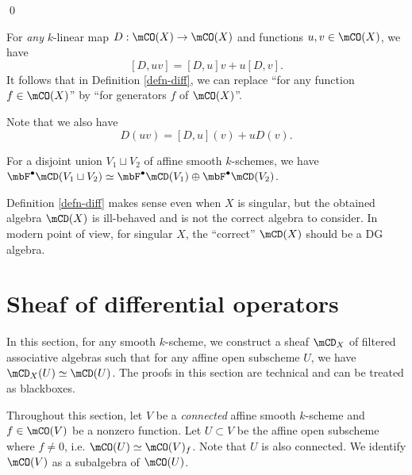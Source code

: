 	\qed

	\begin{rem}
		\label{rem-check-diff}
		For \emph{any} $k$-linear map $D: \mCO(X) \to \mCO(X)$ and functions $u,v\in \mCO(X)$, we have
		\begin{equation}
			\label{eqn-lebniz-for-commutator}
			[D, uv] = [D,u]v + u[D,v].
		\end{equation}
		It follows that in Definition \ref{defn-diff}, we can replace ``for any function $f\in \mCO(X)$'' by ``for generators $f$ of $\mCO(X)$''.

		Note that we also have
		\begin{equation}
			\label{eqn-lebniz-for-operator}
			D(uv) = [D,u](v) + uD(v).
		\end{equation}

	\end{rem}

	\begin{rem}
		\label{rem-diff-disj}
		For a disjoint union $V_1\sqcup V_2$ of affine smooth $k$-schemes, we have $\mbF^\bullet \mCD(V_1\sqcup V_2) \simeq \mbF^\bullet \mCD(V_1) \oplus  \mbF^\bullet \mCD(V_2)$. 
	\end{rem}



	\begin{warn}
		Definition \ref{defn-diff} makes sense even when $X$ is singular, but the obtained algebra $\mCD(X)$ is ill-behaved and is not the correct algebra to consider. In modern point of view, for singular $X$, the ``correct'' $\mCD(X)$ should be a DG algebra.
	\end{warn}

\section{Sheaf of differential operators}

	In this section, for any smooth $k$-scheme, we construct a sheaf $\mCD_X$ of filtered associative algebras such that for any affine open subscheme $U$, we have $\mCD_X(U) \simeq \mCD(U)$. The proofs in this section are technical and can be treated as blackboxes.

	Throughout this section, let $V$ be a \emph{connected} affine smooth $k$-scheme and $f\in \mCO(V)$ be a nonzero function. Let $U\subset V$ be the affine open subscheme where $f\neq 0$, i.e. $\mCO(U) \simeq \mCO(V)_f$. Note that $U$ is also connected. We identify $\mCO(V)$ as a subalgebra of $\mCO(U)$.

